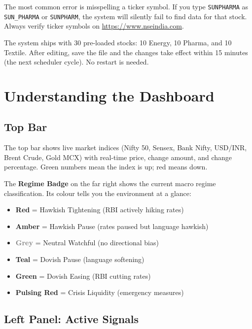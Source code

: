 \documentclass[12pt, a4paper]{report}
\begin{document}
\begin{warningbox}
The most common error is misspelling a ticker symbol. If you type \texttt{SUNPHARMA} as \texttt{SUN\_PHARMA} or \texttt{SUNPHARM}, the system will silently fail to find data for that stock. Always verify ticker symbols on \url{https://www.nseindia.com}.
\end{warningbox}

The system ships with 30 pre-loaded stocks: 10 Energy, 10 Pharma, and 10 Textile. After editing, save the file and the changes take effect within 15 minutes (the next scheduler cycle). No restart is needed.

\chapter{Understanding the Dashboard}

\section{Top Bar}

The top bar shows live market indices (Nifty 50, Sensex, Bank Nifty, USD/INR, Brent Crude, Gold MCX) with real-time price, change amount, and change percentage. Green numbers mean the index is up; red means down.

The \textbf{Regime Badge} on the far right shows the current macro regime classification. Its colour tells you the environment at a glance:
\begin{itemize}
\item \textcolor{imsCrimson}{\textbf{Red}} = Hawkish Tightening (RBI actively hiking rates)
\item \textcolor{imsAmber}{\textbf{Amber}} = Hawkish Pause (rates paused but language hawkish)
\item \textcolor{gray}{\textbf{Grey}} = Neutral Watchful (no directional bias)
\item \textcolor{imsteal}{\textbf{Teal}} = Dovish Pause (language softening)
\item \textcolor{imsEmerald}{\textbf{Green}} = Dovish Easing (RBI cutting rates)
\item \textcolor{imsCrimson}{\textbf{Pulsing Red}} = Crisis Liquidity (emergency measures)
\end{itemize}

\section{Left Panel: Active Signals}
\end{document}
